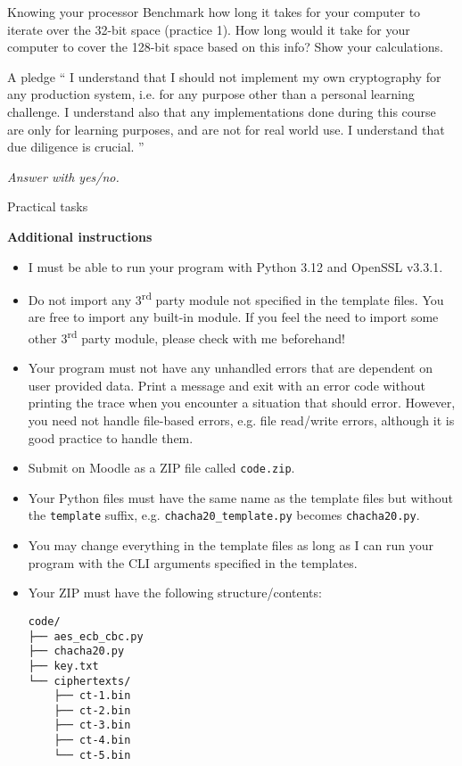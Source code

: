 \documentclass{homework}
\begin{document}
\begin{task}{Knowing your processor}
  Benchmark how long it takes for your computer to iterate over the 32-bit space (practice 1). How long would it take for your computer to cover the 128-bit space based on this info? Show your calculations.
\end{task}

\begin{task}{A pledge}
  \enquote{
    I understand that I should not implement my own cryptography for any production system, i.e. for any purpose other than a personal learning challenge.
    I understand also that any implementations done during this course are only for learning purposes, and are not for real world use. I understand that due diligence is crucial.
  }

  \textit{Answer with yes/no.}
\end{task}

\newpage
\setcounter{task}{0}

\begin{center}
  Practical tasks
\end{center}

\textbf{Additional instructions}

\begin{itemize}
  \item I must be able to run your program with Python 3.12 and OpenSSL v3.3.1\footnotemark{}.
  \item Do not import any 3\textsuperscript{rd} party module\footnotemark{} not specified in the template files.
  You are free to import any built-in module.
  If you feel the need to import some other 3\textsuperscript{rd} party module, please check with me beforehand!
  \item Your program must not have any unhandled errors that are dependent on user provided data.
  Print a message and exit with an error code without printing the trace when you encounter a situation that should error.
  However, you need not handle file-based errors, e.g. file read/write errors, although it is good practice to handle them.
  \item Submit on Moodle as a ZIP file called \texttt{code.zip}.
  \item Your Python files must have the same name as the template files but without the \texttt{template} suffix, e.g. \texttt{chacha20\_template.py} becomes \texttt{chacha20.py}.
  \item You may change everything in the template files as long as I can run your program with the CLI arguments specified in the templates.
  \item Your ZIP must have the following structure/contents:
  \begin{Verbatim}
code/
├── aes_ecb_cbc.py
├── chacha20.py
├── key.txt
└── ciphertexts/
    ├── ct-1.bin
    ├── ct-2.bin
    ├── ct-3.bin
    ├── ct-4.bin
    └── ct-5.bin
  \end{Verbatim}
\end{itemize}
\end{document}
